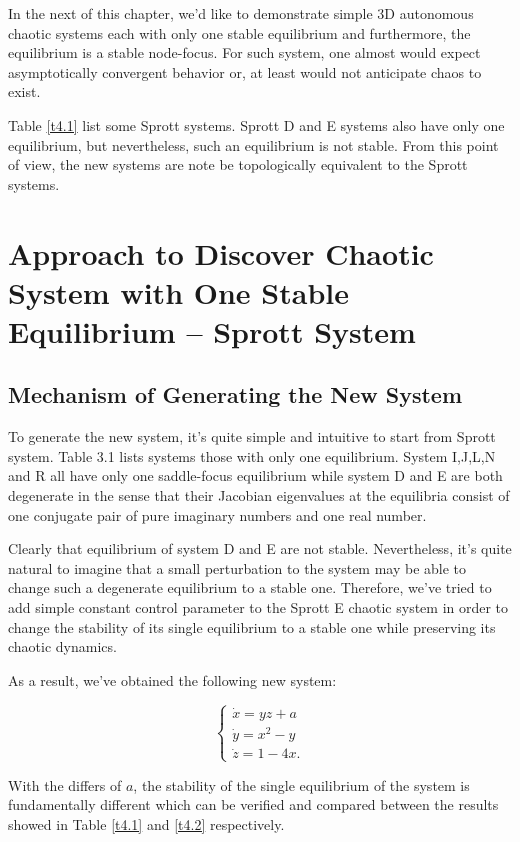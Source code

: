 In the next of this chapter, we'd like to demonstrate simple 3D autonomous chaotic systems each with only one stable
equilibrium and furthermore, the equilibrium is a stable node-focus. For such system, one almost would expect
asymptotically convergent behavior or, at least would not anticipate chaos to exist.

Table \ref{t4.1} list some Sprott systems. Sprott D and E systems also have only one equilibrium, but nevertheless,
such an equilibrium is not stable. From this point of view, the new systems are note be topologically equivalent
to the Sprott systems.

\section{Approach to Discover Chaotic System with One Stable Equilibrium -- Sprott System}

\subsection{Mechanism of Generating the New System}
To generate the new system, it's quite simple and intuitive to start from Sprott system.
Table 3.1 lists systems those with only one equilibrium. System I,J,L,N and R all have 
only one saddle-focus equilibrium while system D and E are both degenerate in the sense
that their Jacobian eigenvalues at the equilibria consist of one conjugate pair of pure 
imaginary numbers and one real number. 

Clearly that equilibrium of system D and E are not stable. Nevertheless, it's quite natural
to imagine that a small perturbation to the system may be able to change such a degenerate
equilibrium to a stable one. Therefore, we've tried to add simple constant control parameter
to the Sprott E chaotic system in order to change the stability of its single equilibrium to 
a stable one while preserving its chaotic dynamics.

As a result, we've obtained the following new system:

\begin{equation}\label{wangeq}
  \left\{
  \begin{array}{l}
    \dot{x}=yz+a\\
    \dot{y}=x^{2}-y \\
    \dot{z}=1-4x.
  \end{array}
  \right.
\end{equation}

With the differs of $a$, the stability of the single equilibrium of the system is
fundamentally different which can be verified and compared between the results showed in
Table \ref{t4.1} and \ref{t4.2} respectively.


